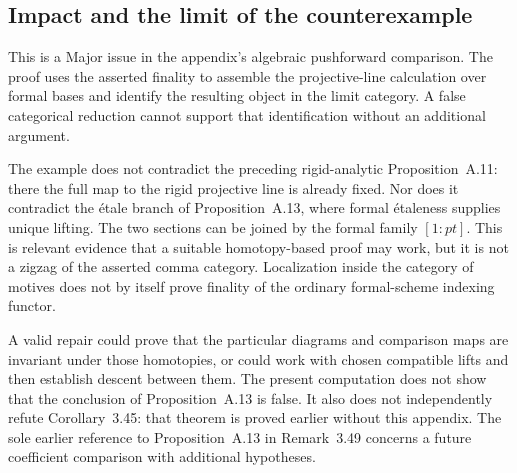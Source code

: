 \documentclass[10pt]{article}
\begin{document}
\subsection*{Impact and the limit of the counterexample}
This is a Major issue in the appendix’s algebraic pushforward comparison. The proof uses the asserted finality to assemble the projective-line calculation over formal bases and identify the resulting object in the limit category. A false categorical reduction cannot support that identification without an additional argument.\par
The example does not contradict the preceding rigid-analytic Proposition A.11: there the full map to the rigid projective line is already fixed. Nor does it contradict the étale branch of Proposition A.13, where formal étaleness supplies unique lifting. The two sections can be joined by the formal family \([1:pt]\). This is relevant evidence that a suitable homotopy-based proof may work, but it is not a zigzag of the asserted comma category. Localization inside the category of motives does not by itself prove finality of the ordinary formal-scheme indexing functor.\par
A valid repair could prove that the particular diagrams and comparison maps are invariant under those homotopies, or could work with chosen compatible lifts and then establish descent between them. The present computation does not show that the conclusion of Proposition A.13 is false. It also does not independently refute Corollary 3.45: that theorem is proved earlier without this appendix. The sole earlier reference to Proposition A.13 in Remark 3.49 concerns a future coefficient comparison with additional hypotheses.\par
\end{document}

